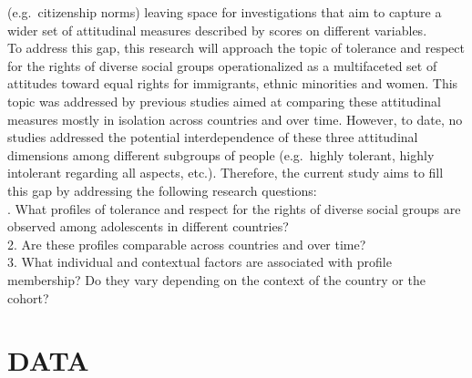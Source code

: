 \documentclass[
  11pt,
]{article}
\begin{document}
(e.g.~citizenship norms) leaving space for investigations that aim to
capture a wider set of attitudinal measures described by scores on
different variables.\\
\newline  To address this gap, this research will approach the topic of
tolerance and respect for the rights of diverse social groups
operationalized as a multifaceted set of attitudes toward equal rights
for immigrants, ethnic minorities and women. This topic was addressed by
previous studies aimed at comparing these attitudinal measures mostly in
isolation across countries and over time. However, to date, no studies
addressed the potential interdependence of these three attitudinal
dimensions among different subgroups of people (e.g.~highly tolerant,
highly intolerant regarding all aspects, etc.). Therefore, the current
study aims to fill this gap by addressing the following research
questions:\\
. What profiles of tolerance and respect for the rights of diverse
social groups are observed among adolescents in different countries?\\
2. Are these profiles comparable across countries and over time?\\
3. What individual and contextual factors are associated with profile
membership? Do they vary depending on the context of the country or the
cohort?

\hypertarget{data}{%
\section{DATA}\label{data}}
\end{document}
